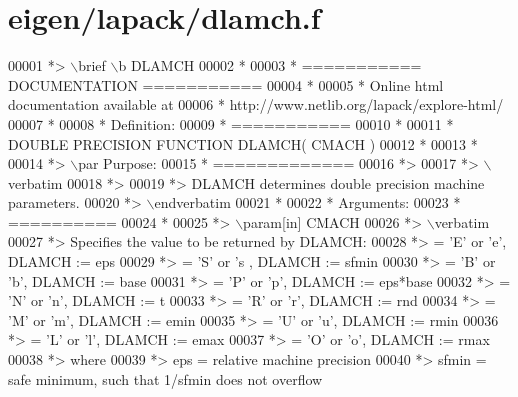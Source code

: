 \hypertarget{eigen_2lapack_2dlamch_8f_source}{}\section{eigen/lapack/dlamch.f}
\label{eigen_2lapack_2dlamch_8f_source}

\begin{DoxyCode}
00001 \textcolor{comment}{*> \(\backslash\)brief \(\backslash\)b DLAMCH}
00002 \textcolor{comment}{*}
00003 \textcolor{comment}{*  =========== DOCUMENTATION ===========}
00004 \textcolor{comment}{*}
00005 \textcolor{comment}{* Online html documentation available at }
00006 \textcolor{comment}{*            http://www.netlib.org/lapack/explore-html/ }
00007 \textcolor{comment}{*}
00008 \textcolor{comment}{*  Definition:}
00009 \textcolor{comment}{*  ===========}
00010 \textcolor{comment}{*}
00011 \textcolor{comment}{*      DOUBLE PRECISION FUNCTION DLAMCH( CMACH )}
00012 \textcolor{comment}{*  }
00013 \textcolor{comment}{*}
00014 \textcolor{comment}{*> \(\backslash\)par Purpose:}
00015 \textcolor{comment}{*  =============}
00016 \textcolor{comment}{*>}
00017 \textcolor{comment}{*> \(\backslash\)verbatim}
00018 \textcolor{comment}{*>}
00019 \textcolor{comment}{*> DLAMCH determines double precision machine parameters.}
00020 \textcolor{comment}{*> \(\backslash\)endverbatim}
00021 \textcolor{comment}{*}
00022 \textcolor{comment}{*  Arguments:}
00023 \textcolor{comment}{*  ==========}
00024 \textcolor{comment}{*}
00025 \textcolor{comment}{*> \(\backslash\)param[in] CMACH}
00026 \textcolor{comment}{*> \(\backslash\)verbatim}
00027 \textcolor{comment}{*>          Specifies the value to be returned by DLAMCH:}
00028 \textcolor{comment}{*>          = 'E' or 'e',   DLAMCH := eps}
00029 \textcolor{comment}{*>          = 'S' or 's ,   DLAMCH := sfmin}
00030 \textcolor{comment}{*>          = 'B' or 'b',   DLAMCH := base}
00031 \textcolor{comment}{*>          = 'P' or 'p',   DLAMCH := eps*base}
00032 \textcolor{comment}{*>          = 'N' or 'n',   DLAMCH := t}
00033 \textcolor{comment}{*>          = 'R' or 'r',   DLAMCH := rnd}
00034 \textcolor{comment}{*>          = 'M' or 'm',   DLAMCH := emin}
00035 \textcolor{comment}{*>          = 'U' or 'u',   DLAMCH := rmin}
00036 \textcolor{comment}{*>          = 'L' or 'l',   DLAMCH := emax}
00037 \textcolor{comment}{*>          = 'O' or 'o',   DLAMCH := rmax}
00038 \textcolor{comment}{*>          where}
00039 \textcolor{comment}{*>          eps   = relative machine precision}
00040 \textcolor{comment}{*>          sfmin = safe minimum, such that 1/sfmin does not overflow}

\end{DoxyCode}
